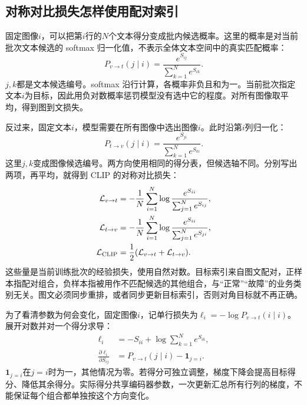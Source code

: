 \subsection{对称对比损失怎样使用配对索引}
固定图像$i$，可以把第$i$行的$N$个文本得分变成批内候选概率。这里的概率是对当前批次文本候选的 softmax 归一化值，不表示全体文本空间中的真实匹配概率：
\begin{equation}
 P_{v\to t}(j\mid i)=\frac{e^{S_{ij}}}{\sum_{k=1}^N e^{S_{ik}}}.
\end{equation}
$j,k$都是文本候选编号。softmax 沿行计算，各概率非负且和为一。当前批次指定文本$i$为目标，因此用负对数概率惩罚模型没有选中它的程度。对所有图像取平均，得到图到文损失。

反过来，固定文本$i$，模型需要在所有图像中选出图像$i$。此时沿第$i$列归一化：
\begin{equation}
 P_{t\to v}(j\mid i)=\frac{e^{S_{ji}}}{\sum_{k=1}^N e^{S_{ki}}}.
\end{equation}
这里$j,k$变成图像候选编号。两方向使用相同的得分表，但候选轴不同。分别写出两项，再平均，就得到 CLIP 的对称对比损失：
\begin{align}
 \mathcal L_{v\to t}&=-\frac1N\sum_{i=1}^N
 \log\frac{e^{S_{ii}}}{\sum_{j=1}^N e^{S_{ij}}},\\
 \mathcal L_{t\to v}&=-\frac1N\sum_{i=1}^N
 \log\frac{e^{S_{ii}}}{\sum_{j=1}^N e^{S_{ji}}},\\
 \mathcal L_{\rm CLIP}&=\frac12
 (\mathcal L_{v\to t}+\mathcal L_{t\to v}).
 \label{eq:multimodal-clip-loss}
\end{align}
这些量是当前训练批次的经验损失，使用自然对数。目标索引来自图文配对，正样本指配对组合，负样本指被用作不匹配候选的其他组合，与“正常”“故障”的业务类别无关。图文必须同步重排，或者同步更新目标索引，否则对角目标就不再正确。

为了看清参数为何会变化，固定图像$i$，记单行损失为$\ell_i=-\log P_{v\to t}(i\mid i)$。展开对数并对一个得分求导：
\begin{align}
 \ell_i&=-S_{ii}+\log\sum_{k=1}^N e^{S_{ik}},\\
 \frac{\partial\ell_i}{\partial S_{ij}}
 &=P_{v\to t}(j\mid i)-\mathbf1_{j=i}.\label{eq:multimodal-clip-score-gradient}
\end{align}
$\mathbf1_{j=i}$在$j=i$时为一，其他情况为零。若得分可独立调整，梯度下降会提高目标得分、降低其余得分。实际得分共享编码器参数，一次更新汇总所有行列的梯度，不能保证每个组合都单独按这个方向变化。

